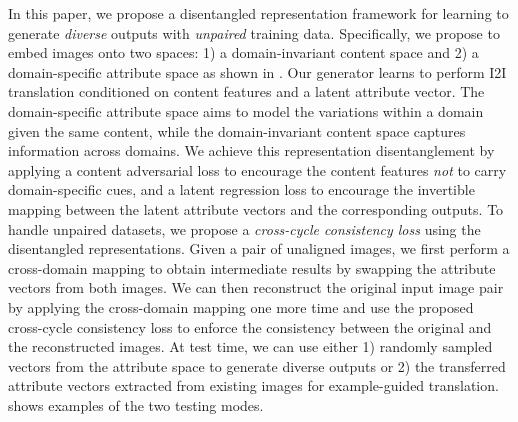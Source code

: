 \documentclass[runningheads]{llncs}
\renewcommand{\jiabin}[1]{}
\begin{document}
In this paper, we propose a disentangled representation framework for learning to generate \emph{diverse} outputs with \emph{unpaired} training data.
%
Specifically, we propose to embed images onto two spaces: 
1) a domain-invariant content space and 2) a domain-specific attribute space as shown in .
%
%
%
Our generator learns to perform I2I translation conditioned on content features and a latent attribute vector. 
%
The domain-specific attribute space aims to model the variations within a domain given the same content, while the domain-invariant content space captures information across domains.
% 
We achieve this representation disentanglement by applying a content adversarial loss to encourage the content features \emph{not} to carry domain-specific cues, and a latent regression loss to encourage the invertible mapping between the latent attribute vectors and the corresponding outputs.
%
To handle unpaired datasets, we propose a \textit{cross-cycle consistency loss} using the disentangled representations.
%
Given a pair of unaligned images, we first perform a cross-domain mapping to obtain intermediate results by swapping the attribute vectors from both images.
%
We can then reconstruct the original input image pair by applying the cross-domain mapping one more time and use the proposed cross-cycle consistency loss to enforce the consistency between the original and the reconstructed images. 
%
%
At test time, we can use either 
1) randomly sampled vectors from the attribute space to generate diverse outputs or 
2) the transferred attribute vectors extracted from existing images for example-guided translation.
%
 shows examples of the two testing modes.
\end{document}
